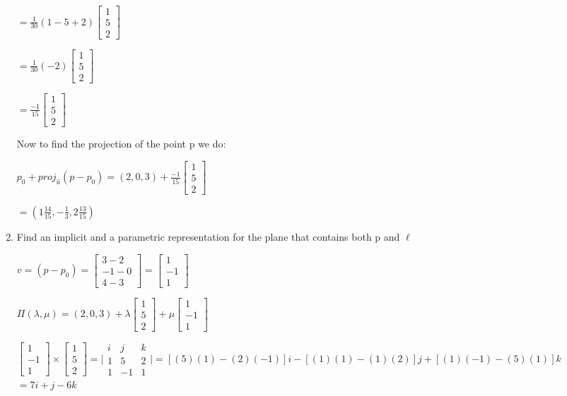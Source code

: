 \documentclass{article}
\begin{document}
\begin{enumerate}
        $= \frac{1}{30} (1 - 5 + 2) \begin{bmatrix} 1 \\ 5 \\ 2\end{bmatrix}$

        $= \frac{1}{30} (-2) \begin{bmatrix} 1 \\ 5 \\ 2\end{bmatrix}$

        $= \frac{-1}{15} \begin{bmatrix} 1 \\ 5 \\ 2\end{bmatrix}$

        Now to find the projection of the point p we do:

        $p_0 + proj_{\hat{u}}(p - p_0) = (2, 0, 3) + \frac{-1}{15} \begin{bmatrix} 1 \\ 5 \\ 2\end{bmatrix}$

        $ = (1 \frac{14}{15}, -\frac{1}{3}, 2 \frac{13}{15} )$

        \item Find an implicit and a parametric representation for the plane that contains both p and $\ell$
       
        $v = (p - p_0) =  \begin{bmatrix} 3 - 2 \\ -1 - 0 \\ 4 - 3 \end{bmatrix} = \begin{bmatrix} 1 \\ -1 \\ 1 \end{bmatrix}$

        $\Pi(\lambda, \mu) = (2,0,3) + \lambda \begin{bmatrix} 1 \\ 5 \\ 2\end{bmatrix} + \mu \begin{bmatrix} 1 \\ -1 \\ 1 \end{bmatrix}$

        $\begin{bmatrix} 1 \\ -1 \\ 1 \end{bmatrix} \times \begin{bmatrix} 1 \\ 5 \\ 2\end{bmatrix} = \Bigg | \begin{matrix}
            i & j & k \\
            1 & 5 & 2 \\
            1 & -1 & 1
        \end{matrix} \Bigg | = [(5)(1) - (2)(-1)] i - [(1)(1) - (1)(2)] j + [(1)(-1) - (5)(1)] k$
        $ = 7i + j - 6k$


\end{enumerate}
\end{document}
